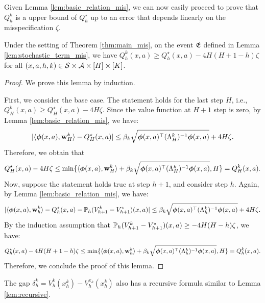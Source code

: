 Given Lemma \ref{lem:basic_relation_mis}, we can now easily proceed to prove that $Q^k_h$ is a upper bound of $Q^\star_h$ up to an error that depends linearly on the misspecification $\zeta$.

\begin{lemma}[UCB] \label{lem:UCB_misspecified}
Under the setting of Theorem \ref{thm:main_mis}, on the event $\fE$ defined in Lemma \ref{lem:stochastic_term_mis}, we have $Q^k_h(x, a) \ge Q^\star_h(x, a) - 4H(H+1-h)\zeta$ for all $(x, a, h, k) \in \cS\times\cA\times[H]\times[K]$.
\end{lemma}

\begin{proof}
We prove this lemma by induction. 

First, we consider the base case. The statement holds for the last step $H$, i.e., $Q^k_H(x, a) \ge Q^\star_H(x, a) - 4H\zeta$. Since the value function at $H+1$ step is zero, by Lemma \ref{lem:basic_relation_mis}, we have:
\begin{equation*}
|\la\bphi(x, a), \w^k_H\ra - Q_H^\star(x, a)| \le \beta_k \sqrt{\bphi(x, a)\trans (\Lambda^k_H)^{-1}  \bphi(x, a)} + 4H\zeta. 
\end{equation*}
Therefore, we obtain that 
\begin{equation*}
Q_H^\star(x, a) - 4H\zeta \le \min\{\la\bphi(x, a), \w^k_H\ra + \beta_k\sqrt{\bphi(x, a)\trans (\Lambda^k_H)^{-1}  \bphi(x, a)}, H\} = Q^k_H(x, a). 
\end{equation*}
Now, suppose the statement holds true at step $h+1$, and consider step $h$. Again, by Lemma \ref{lem:basic_relation_mis}, we have:
\begin{equation*}
|\la\bphi(x, a), \w^k_h\ra - Q_h^\star(x, a) -  \P_h (V^{k}_{h+1} - V^{\star}_{h+1})(x, a)| \le \beta_k \sqrt{\bphi(x, a)\trans (\Lambda^k_h)^{-1}  \bphi(x, a)}
+ 4H\zeta. 
\end{equation*}
By the induction assumption that $\P_h (V^{k}_{h+1} - V^{\star}_{h+1})(x, a) \ge -4H(H-h)\zeta$, we have:
\begin{equation*}
Q_h^\star(x, a) - 4H(H+1-h)\zeta \le \min\{\la\bphi(x, a), \w^k_h\ra + \beta_k\sqrt{\bphi(x, a)\trans (\Lambda^k_h)^{-1}  \bphi(x, a)}, H\} = Q^k_h(x, a).
\end{equation*}
Therefore, we conclude the proof of this lemma.
\end{proof}

The gap $\delta^k_h = V^k_h(x^{k}_{h}) - V^{\pi_k}_h(x^{k}_{h})$ also has a recursive formula similar to Lemma \ref{lem:recursive}.

